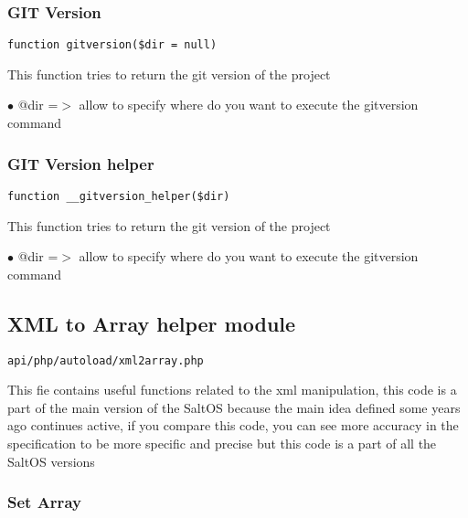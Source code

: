 \documentclass[a4paper]{article}
\begin{document}
\hypertarget{toc271}{}
\subsubsection{GIT Version}

\begin{lstlisting}
function gitversion($dir = null)
\end{lstlisting}

This function tries to return the git version of the project

\begin{compactitem}
\item[\color{myblue}$\bullet$] @dir =$>$ allow to specify where do you want to execute the gitversion command
\end{compactitem}

\hypertarget{toc272}{}
\subsubsection{GIT Version helper}

\begin{lstlisting}
function __gitversion_helper($dir)
\end{lstlisting}

This function tries to return the git version of the project

\begin{compactitem}
\item[\color{myblue}$\bullet$] @dir =$>$ allow to specify where do you want to execute the gitversion command
\end{compactitem}

\hypertarget{toc273}{}
\subsection{XML to Array helper module}

\begin{lstlisting}
api/php/autoload/xml2array.php
\end{lstlisting}

This fie contains useful functions related to the xml manipulation, this code is a part of the
main version of the SaltOS because the main idea defined some years ago continues active, if you
compare this code, you can see more accuracy in the specification to be more specific and precise
but this code is a part of all the SaltOS versions

\hypertarget{toc274}{}
\subsubsection{Set Array}
\end{document}
